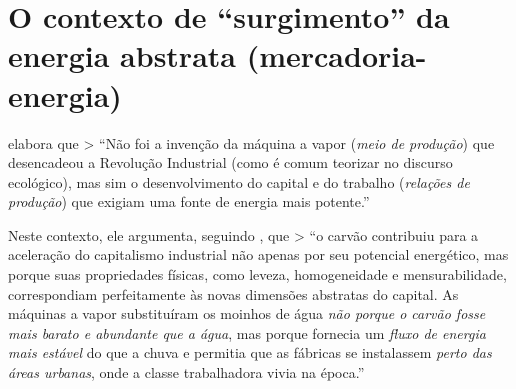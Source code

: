 \documentclass[12pt]{article}
\numberwithin{equation}{section}
\theoremstyle{plain}
\theoremstyle{definition}
\theoremstyle{remark}
\begin{document}
\hypertarget{o-contexto-de-surgimento-da-energia-abstrata-mercadoria-energia}{%
\section{O contexto de ``surgimento'' da energia abstrata (mercadoria-energia)}\label{o-contexto-de-surgimento-da-energia-abstrata-mercadoria-energia}}

\textcite{Pasquinelli2023} elabora que \textgreater{} ``Não foi a invenção da máquina a vapor (\textit{meio de produção}) que desencadeou a Revolução Industrial (como é comum teorizar no discurso ecológico), mas sim o desenvolvimento do capital e do trabalho (\textit{relações de produção}) que exigiam uma fonte de energia mais potente.'' \parencite[, p. 107]{Pasquinelli2023}

Neste contexto, ele argumenta, seguindo \textcite{Malm2016}, que \textgreater{} ``o carvão contribuiu para a aceleração do capitalismo industrial não apenas por seu potencial energético, mas porque suas propriedades físicas, como leveza, homogeneidade e mensurabilidade, correspondiam perfeitamente às novas dimensões abstratas do capital. As máquinas a vapor substituíram os moinhos de água \textit{não porque o carvão fosse mais barato e abundante que a água}, mas porque fornecia um \textit{fluxo de energia mais estável} do que a chuva e permitia que as fábricas se instalassem \textit{perto das áreas urbanas}, onde a classe trabalhadora vivia na época.'' \parencite[, p. 122-3, grifo meu]{Pasquinelli2023}
\end{document}
